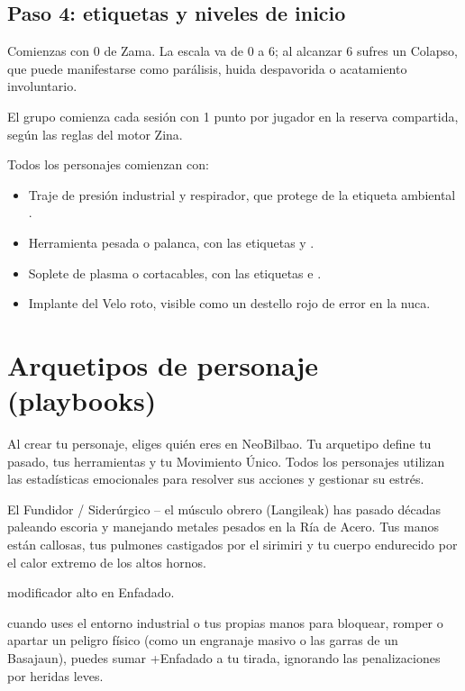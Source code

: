 \subsection{Paso 4: etiquetas y niveles de inicio}

 Comienzas con 0 de Zama. La escala va de 0 a 6; al alcanzar 6 sufres un Colapso, que puede manifestarse como parálisis, huida despavorida o acatamiento involuntario.

 El grupo comienza cada sesión con 1 punto por jugador en la reserva compartida, según las reglas del motor Zina.

 Todos los personajes comienzan con:
\begin{itemize}
  \item Traje de presión industrial y respirador, que protege de la etiqueta ambiental .
  \item Herramienta pesada o palanca, con las etiquetas  y .
  \item Soplete de plasma o cortacables, con las etiquetas  e .
  \item Implante del Velo roto, visible como un destello rojo de error en la nuca.
\end{itemize}

\section{Arquetipos de personaje (playbooks)}

Al crear tu personaje, eliges quién eres en NeoBilbao. Tu arquetipo define tu pasado, tus herramientas y tu Movimiento Único. Todos los personajes utilizan las estadísticas emocionales para resolver sus acciones y gestionar su estrés.

\begin{FichaArquetipo}{El Fundidor / Siderúrgico -- el músculo obrero (Langileak)}
 has pasado décadas paleando escoria y manejando metales pesados en la Ría de Acero. Tus manos están callosas, tus pulmones castigados por el sirimiri y tu cuerpo endurecido por el calor extremo de los altos hornos.\par
{} modificador alto en Enfadado.\par
{} cuando uses el entorno industrial o tus propias manos para bloquear, romper o apartar un peligro físico (como un engranaje masivo o las garras de un Basajaun), puedes sumar +Enfadado a tu tirada, ignorando las penalizaciones por heridas leves.
\end{FichaArquetipo}

